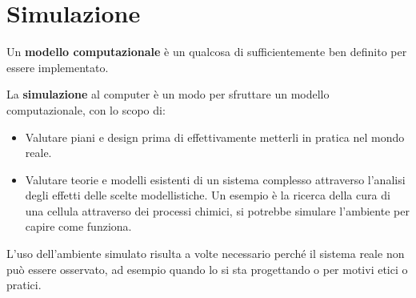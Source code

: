 \section{Simulazione}
\begin{definizione}
      Un \textbf{modello computazionale} è un qualcosa di sufficientemente ben
      definito per essere implementato.
\end{definizione}
\begin{definizione}
      La \textbf{simulazione} al computer è un modo per sfruttare un modello
      computazionale, con lo scopo di:
      \begin{itemize}
            \item Valutare piani e design prima di effettivamente metterli in
                  pratica nel mondo reale.
            \item Valutare teorie e modelli esistenti di un sistema complesso
                  attraverso l'analisi degli effetti delle scelte modellistiche.
                  Un esempio è la ricerca della cura di una cellula attraverso
                  dei processi chimici, si potrebbe simulare l'ambiente per
                  capire come funziona.
      \end{itemize}
\end{definizione}
L'uso dell'ambiente simulato risulta a volte necessario perché il sistema reale
non può essere osservato, ad esempio quando lo si sta progettando o per motivi
etici o pratici.

